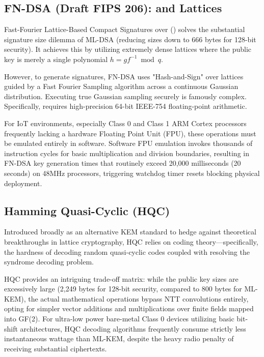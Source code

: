 \subsection{FN-DSA (Draft FIPS 206): \falcon{} and \ntru{} Lattices}
Fast-Fourier Lattice-Based Compact Signatures over \ntru{} (\falcon{}) solves the substantial signature size dilemma of ML-DSA (reducing sizes down to 666 bytes for 128-bit security). It achieves this by utilizing extremely dense \ntru{} lattices where the public key is merely a single polynomial $h = g f^{-1} \bmod q$.

However, to generate signatures, FN-DSA uses "Hash-and-Sign" over \ntru{} lattices guided by a Fast Fourier Sampling algorithm across a continuous Gaussian distribution. Executing true Gaussian sampling securely is famously complex. Specifically, \falcon{} requires high-precision 64-bit IEEE-754 floating-point arithmetic. 

For IoT environments, especially Class 0 and Class 1 ARM Cortex processors frequently lacking a hardware Floating Point Unit (FPU), these operations must be emulated entirely in software. Software FPU emulation invokes thousands of instruction cycles for basic multiplication and division boundaries, resulting in FN-DSA key generation times that routinely exceed 20,000 milliseconds (20 seconds) on 48MHz processors, triggering watchdog timer resets blocking physical deployment.

\subsection{Hamming Quasi-Cyclic (HQC)}
Introduced broadly as an alternative KEM standard to hedge against theoretical breakthroughs in lattice cryptography, HQC relies on coding theory—specifically, the hardness of decoding random quasi-cyclic codes coupled with resolving the syndrome decoding problem.

HQC provides an intriguing trade-off matrix: while the public key sizes are excessively large (2,249 bytes for 128-bit security, compared to 800 bytes for ML-KEM), the actual mathematical operations bypass NTT convolutions entirely, opting for simpler vector additions and multiplications over finite fields mapped into GF(2). For ultra-low power bare-metal Class 0 devices utilizing basic bit-shift architectures, HQC decoding algorithms frequently consume strictly less instantaneous wattage than ML-KEM, despite the heavy radio penalty of receiving substantial ciphertexts.
